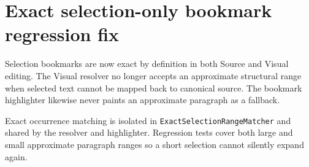 \documentclass[a4paper]{article}
\title{}
\date{}
\author{Mohammad Rahmani}
\begin{document}
   \maketitle

   \section*{Exact selection-only bookmark regression fix}

   Selection bookmarks are now exact by definition in both Source and Visual
   editing. The Visual resolver no longer accepts an approximate structural
   range when selected text cannot be mapped back to canonical source. The
   bookmark highlighter likewise never paints an approximate paragraph as a
   fallback.

   Exact occurrence matching is isolated in
   \texttt{ExactSelectionRangeMatcher} and shared by the resolver and
   highlighter. Regression tests cover both large and small approximate
   paragraph ranges so a short selection cannot silently expand again.

   
   
\end{document}
